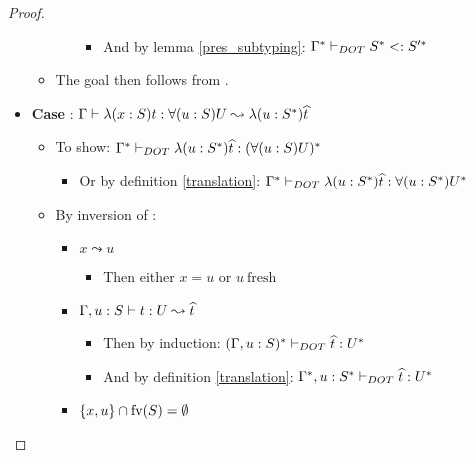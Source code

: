 \begin{proof}
\begin{itemize}
\begin{itemize}
\begin{itemize}
\begin{itemize}
                    \item And by lemma \ref{pres_subtyping}:
                        $\Gamma^{*} \vdash_{DOT} S^{*} <: S'^{*}$
                \end{itemize}
            \end{itemize}
            \item The goal then follows from .
        \end{itemize}
        \item \textbf{Case} : $\Gamma \vdash \lambda(x:S)t: \forall(u:S)U \leadsto \lambda(u:S^{*})\widehat{t}$
        \begin{itemize}
            \item To show: $\Gamma^{*} \vdash_{DOT} \lambda(u:S^{*})\widehat{t}: (\forall(u:S)U)^{*}$
            \begin{itemize}
                \item Or by definition \ref{translation}:
                    $\Gamma^{*} \vdash_{DOT} \lambda(u:S^{*})\widehat{t}: \forall(u:S^{*})U^{*}$
            \end{itemize}
            \item By inversion of :
            \begin{itemize}
                \item $x \leadsto u$
                \begin{itemize}
                    \item Then either $x = u$ or $u\ \text{fresh}$
                \end{itemize}
                \item $\Gamma, u: S \vdash t: U \leadsto \widehat{t}$
                \begin{itemize}
                    \item Then by induction:
                        $(\Gamma, u: S)^{*} \vdash_{DOT} \widehat{t}: {U}^{*}$
                    \item And by definition \ref{translation}:
                        $\Gamma^{*}, u: S^{*} \vdash_{DOT} \widehat{t}: {U}^{*}$
                \end{itemize}
                \item $\{x, u\} \cap \text{fv}(S) = \emptyset$
\end{itemize}
\end{itemize}
\end{itemize}
\end{proof}
